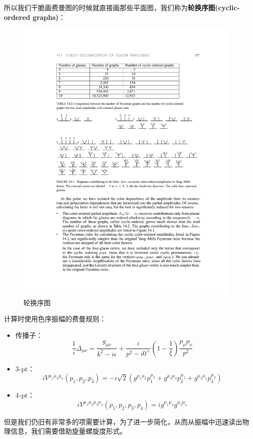 所以我们干脆画费曼图的时候就直接画那些平面图，我们称为\textbf{轮换序图(cyclic-ordered
graphs)}：
\begin{figure}[H]
	\centering
	\includegraphics[width=\linewidth]{figs/fig15.pdf}
	\caption{轮换序图}
\end{figure}
计算时使用色序振幅的费曼规则：
\begin{itemize}
	\item 传播子：
	\begin{equation}
		\frac{1}{i}\Delta_{\mu\nu}=\frac{g_{\mu\nu}}{k^2-i\epsilon}+\frac i{p^2-i0^+}\left(1-\frac1\xi\right)\frac{p_{\mu}p_{\nu}}{p^2}
	\end{equation}
	\item 3-pt：
	\begin{equation}
		iV^{\mu_1\mu_2\mu_3}(p_1,p_2,p_3)=-i\sqrt{2}\left(g^{\mu_1\mu_2}p_1^{\mu_3}+g^{\mu_2\mu_3}p_2^{\mu_1}+g^{\mu_3\mu_1}p_3^{\mu_2}\right)
	\end{equation}
	\item 4-pt：
	\begin{equation}
		iV^{\mu_1\mu_2\mu_3\mu_4}(p_1,p_2,p_3,p_4)=ig^{\mu_1\mu_3}g^{\mu_2\mu_4}
	\end{equation}
\end{itemize}
但是我们仍旧有非常多的项需要计算，为了进一步简化，从而从振幅中迅速读出物理信息，我们需要借助旋量螺旋度形式。
